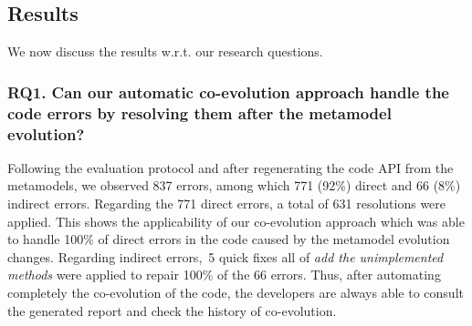 \subsection{Results}
We now discuss the results w.r.t. our research questions.

\subsubsection{RQ1. Can our automatic co-evolution approach handle the code errors by resolving them after the metamodel evolution?}

Following the evaluation protocol and after regenerating the code API from the metamodels, we observed 837 errors, among which 771 (92\%) direct and 66 (8\%) indirect errors. 
%
Regarding the 771 direct errors, 
a total of 631 resolutions were applied.  
This shows the applicability of our co-evolution approach which was able to handle 100\% of direct errors in the code caused by the metamodel evolution changes. Regarding indirect errors,~5 quick fixes all of \emph{add the unimplemented methods}  were applied to repair 100\% of the 66 errors.
Thus, after automating completely the co-evolution of the code, the developers are always able to consult the generated report and check the history of co-evolution.

